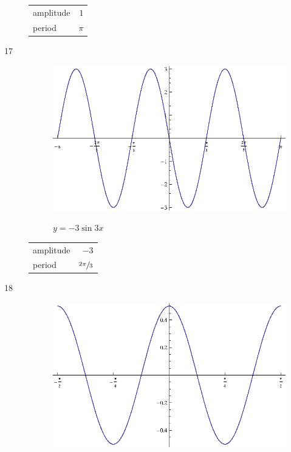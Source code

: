 \documentclass{exam}
\begin{document}
\begin{description}
        \begin{tabular}[H]{lr}
          \toprule
          amplitude & $1$ \\
          period    & $\pi$ \\
          \bottomrule
        \end{tabular}

      \item[17]
        \begin{figure}[H]
          \centering
          \includegraphics[scale=0.9]{exercise17.eps}

          $y = - 3 \sin 3x$
        \end{figure}

        \begin{tabular}[H]{lr}
          \toprule
          amplitude & $-3$ \\
          period    & $\sfrac{2 \pi}{3}$ \\
          \bottomrule
        \end{tabular}

      \item[18]
        \begin{figure}[H]
          \centering
          \includegraphics[scale=0.9]{exercise18.eps}


\end{figure}
\end{description}
\end{document}

